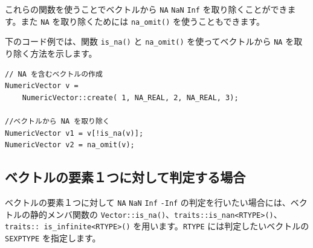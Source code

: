 \documentclass[]{book}
\newenvironment{Shaded}{\begin{snugshade}}{\end{snugshade}}
\newcommand{\CommentTok}[1]{\textcolor[rgb]{0.56,0.35,0.01}{\textit{#1}}}
\newcommand{\ControlFlowTok}[1]{\textcolor[rgb]{0.13,0.29,0.53}{\textbf{#1}}}
\newcommand{\DataTypeTok}[1]{\textcolor[rgb]{0.13,0.29,0.53}{#1}}
\newcommand{\DecValTok}[1]{\textcolor[rgb]{0.00,0.00,0.81}{#1}}
\newcommand{\NormalTok}[1]{#1}
\newcommand{\SpecialCharTok}[1]{\textcolor[rgb]{0.00,0.00,0.00}{#1}}
\newcommand{\StringTok}[1]{\textcolor[rgb]{0.31,0.60,0.02}{#1}}
\begin{document}
これらの関数を使うことでベクトルから \texttt{NA} \texttt{NaN} \texttt{Inf} を取り除くことができます。また \texttt{NA} を取り除くためには \texttt{na\_omit()} を使うこともできます。

下のコード例では、関数 \texttt{is\_na()} と \texttt{na\_omit()} を使ってベクトルから \texttt{NA} を取り除く方法を示します。

\begin{verbatim}
// NA を含むベクトルの作成
NumericVector v =
    NumericVector::create( 1, NA_REAL, 2, NA_REAL, 3);

//ベクトルから NA を取り除く
NumericVector v1 = v[!is_na(v)];
NumericVector v2 = na_omit(v);
\end{verbatim}

\subsection{ベクトルの要素１つに対して判定する場合}

ベクトルの要素１つに対して \texttt{NA} \texttt{NaN} \texttt{Inf} \texttt{-Inf} の判定を行いたい場合には、ベクトルの静的メンバ関数の \texttt{Vector::is\_na()}、\texttt{traits::is\_nan\textless{}RTYPE\textgreater{}()}、\texttt{traits::\ is\_infinite\textless{}RTYPE\textgreater{}()} を用います。\texttt{RTYPE} には判定したいベクトルの \texttt{SEXPTYPE} を指定します。

\begin{Shaded}
\end{Shaded}
\end{document}
